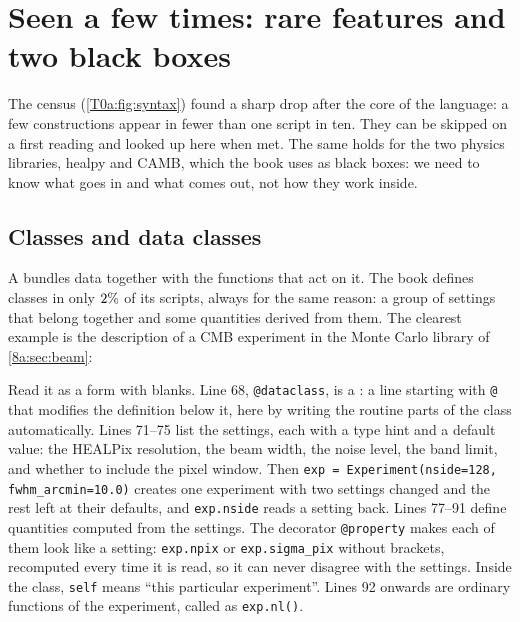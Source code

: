 \section{Seen a few times: rare features and two black boxes}
\label{T0a:sec:rare}

The census (\cref{T0a:fig:syntax}) found a sharp drop after the core of the language: a few constructions appear in fewer than one script in ten. They can be skipped on a first reading and looked up here when met. The same holds for the two physics libraries, healpy and CAMB, which the book uses as black boxes: we need to know what goes in and what comes out, not how they work inside.

\subsection{Classes and data classes}
\label{T0a:sec:classes}

A  bundles data together with the functions that act on it. The book defines classes in only $2\%$ of its scripts, always for the same reason: a group of settings that belong together and some quantities derived from them. The clearest example is the description of a CMB experiment in the Monte Carlo library of \cref{8a:sec:beam}:


Read it as a form with blanks. Line 68, \texttt{@dataclass}, is a : a line starting with \texttt{@} that modifies the definition below it, here by writing the routine parts of the class automatically. Lines 71--75 list the settings, each with a type hint and a default value: the HEALPix resolution, the beam width, the noise level, the band limit, and whether to include the pixel window. Then \texttt{exp = Experiment(nside=128, fwhm\_arcmin=10.0)} creates one experiment with two settings changed and the rest left at their defaults, and \texttt{exp.nside} reads a setting back. Lines 77--91 define quantities computed from the settings. The decorator \texttt{@property} makes each of them look like a setting: \texttt{exp.npix} or \texttt{exp.sigma\_pix} without brackets, recomputed every time it is read, so it can never disagree with the settings. Inside the class, \texttt{self} means ``this particular experiment''. Lines 92 onwards are ordinary functions of the experiment, called as \texttt{exp.nl()}.

